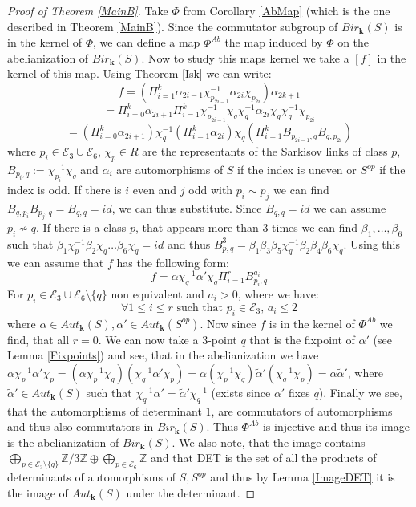 \documentclass[12pt, oneside, reqno]{amsart}
\begin{document}
\begin{proof}[Proof of Theorem \ref{MainB}]
    Take $\Phi$ from Corollary \ref{AbMap} (which is the one described in Theorem \ref{MainB}). Since the commutator subgroup of $Bir_{\textbf{k}}(S)$ is in the kernel of $\Phi$, we can define a map $\Phi^{Ab}$ the map induced by $\Phi$ on the abelianization of $Bir_{\textbf{k}}(S)$. Now to study this maps kernel we take a $[f]$ in the kernel of this map. Using Theorem \ref{Isk} we can write: \[f = (\Pi_{i=1}^k \alpha_{2i - 1} \chi_{p_{2i-1}}^{-1} \alpha_{2i} \chi_{p_{2i}}) \alpha_{2k + 1} \] 
    \[= \Pi_{i=0}^k \alpha_{2i+1} \Pi_{i=1}^k \chi_{p_{2i -1}}^{-1} \chi_q \chi_q^{-1} \alpha_{2i} \chi_q \chi_q^{-1} \chi_{p_{2i}}\]
    \[ = (\Pi_{i=0}^k \alpha_{2i+1}) \chi_q^{-1} (\Pi_{i=1}^k \alpha_{2i}) \chi_q (\Pi_{i=1}^k B_{p_{2i -1},q}B_{q,p_{2i}})\] 
    where $p_i \in \mathcal{E}_3 \cup \mathcal{E}_6$, $\chi_p \in R$ are the representants of the Sarkisov links of class $p$, $B_{p_i,q} := \chi_{p_i}^{-1}\chi_q$ and $\alpha_i$ are automorphisms of $S$ if the index is uneven or $S^{op}$ if the index is odd. If there is $i$ even and $j$ odd with $p_i \sim p_j$ we can find $B_{q,p_i} B_{p_j,q} = B_{q,q} = id$, we can thus substitute. Since $B_{q,q} = id$ we can assume $p_i \not\sim q$. If there is a class $p$, that appears more than 3 times we can find $\beta_1, \dots , \beta_6$ such that $\beta_1 \chi_p^{-1} \beta_2\chi_q \dots \beta_6 \chi_q = id$ and thus $B_{p,q}^3 = \beta_1 \beta_3 \beta_5 \chi_q^{-1} \beta_2 \beta_4 \beta_6 \chi_q$. Using this we can assume that $f$ has the following form:
    \begin{equation}
        f = \alpha \chi_q^{-1} \alpha' \chi_q \Pi_{i=1}^r B_{p_i,q}^{a_i}
    \end{equation}
    For $p_i \in \mathcal{E}_3 \cup \mathcal{E}_6 \setminus \{ q \}$ non equivalent and $a_i>0$, where we have:
    \begin{equation} 
        \forall 1 \leq i \leq r \text{ such that } p_i \in \mathcal{E}_3, \, a_i \leq 2
    \end{equation}
    where $\alpha \in Aut_{\textbf{k}}(S), \alpha' \in Aut_{\textbf{k}}(S^{op})$. Now since $f$ is in the kernel of $\Phi^{Ab}$ we find, that all $r = 0$. We can now take a $3$-point $q$ that is the fixpoint of $\alpha'$ (see Lemma \ref{Fixpoints}) and see, that in the abelianization we have $\alpha \chi_p^{-1} \alpha' \chi_p = (\alpha \chi_p^{-1} \chi_q) (\chi_q^{-1}\alpha' \chi_p) = \alpha (\chi_p^{-1} \chi_q) \tilde \alpha' (\chi_q^{-1} \chi_p) = \alpha \tilde \alpha'$, where $\tilde \alpha' \in Aut_{\textbf{k}}(S)$ such that $\chi_q^{-1} \alpha' = \tilde \alpha' \chi_q^{-1}$ (exists since $\alpha'$ fixes $q$). Finally we see, that the automorphisms of determinant $1$, are commutators of automorphisms and thus also commutators in $Bir_{\textbf{k}}(S)$. Thus $\Phi^{Ab}$ is injective and thus its image is the abelianization of $Bir_{\textbf{k}}(S)$. We also note, that the image contains $\bigoplus_{p \in \mathcal{E}_3 \setminus \{ q \}} \mathbb{Z}/3\mathbb{Z} \oplus \bigoplus_{p \in \mathcal{E}_6} \mathbb{Z}$ and that DET is the set of all the products of determinants of automorphisms of $S,S^{op}$ and thus by Lemma \ref{ImageDET} it is the image of $Aut_{\textbf{k}}(S)$ under the determinant. 
\end{proof}
\end{document}
